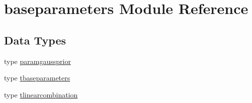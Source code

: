 \hypertarget{namespacebaseparameters}{}\section{baseparameters Module Reference}
\label{namespacebaseparameters}
\subsection*{Data Types}
\begin{DoxyCompactItemize}
\item 
type \mbox{\hyperlink{structbaseparameters_1_1paramgaussprior}{paramgaussprior}}
\item 
type \mbox{\hyperlink{structbaseparameters_1_1tbaseparameters}{tbaseparameters}}
\item 
type \mbox{\hyperlink{structbaseparameters_1_1tlinearcombination}{tlinearcombination}}
\end{DoxyCompactItemize}
